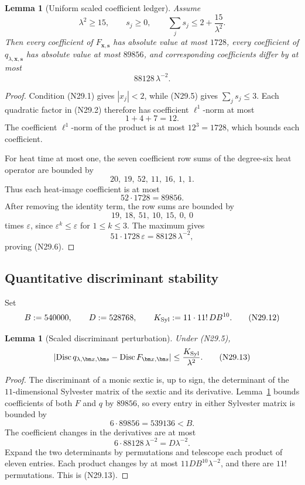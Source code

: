 \documentclass[11pt]{article}
\newtheorem{lemma}[theorem]{Lemma}
\theoremstyle{definition}
\theoremstyle{remark}
\begin{document}
\begin{lemma}[Uniform scaled coefficient ledger]
\label{lem:f2v29-scaled-ledger}
Assume
\[
 \lambda^2\geq15,\qquad
 s_j\geq0,\qquad
 \sum_js_j\leq2+\frac{15}{\lambda^2}.
 \tag{N29.5}
\]
Then every coefficient of \(F_{\bm x,\bm s}\) has absolute value at
most \(1728\), every coefficient of
\(q_{\lambda,\bm x,\bm s}\) has absolute value at most \(89856\), and
corresponding coefficients differ by at most
\[
 88128\,\lambda^{-2}.
 \tag{N29.6}
\]
\end{lemma}

\begin{proof}
Condition \textup{(N29.1)} gives \(|x_j|<2\), while
\textup{(N29.5)} gives \(\sum_js_j\leq3\).  Each quadratic factor in
\textup{(N29.2)} therefore has coefficient \(\ell^1\)-norm at most
\[
 1+4+7=12.
 \tag{N29.7}
\]
The coefficient \(\ell^1\)-norm of the product is at most
\(12^3=1728\), which bounds each coefficient.

For heat time at most one, the seven coefficient row sums of the
degree-six heat operator are bounded by
\[
 20,\ 19,\ 52,\ 11,\ 16,\ 1,\ 1.
 \tag{N29.8}
\]
Thus each heat-image coefficient is at most
\[
 52\cdot1728=89856.
 \tag{N29.9}
\]
After removing the identity term, the row sums are bounded by
\[
 19,\ 18,\ 51,\ 10,\ 15,\ 0,\ 0
 \tag{N29.10}
\]
times \(\varepsilon\), since
\(\varepsilon^k\leq\varepsilon\) for \(1\leq k\leq3\).
The maximum gives
\[
 51\cdot1728\,\varepsilon
 =88128\,\lambda^{-2},
 \tag{N29.11}
\]
proving \textup{(N29.6)}.
\end{proof}

\subsection{Quantitative discriminant stability}
\label{subsec:f2v29-discriminant}

Set
\[
 B:=540000,\qquad D:=528768,\qquad
 K_{\rm Syl}:=11\cdot11!\,D B^{10}.
 \tag{N29.12}
\]

\begin{lemma}[Scaled discriminant perturbation]
\label{lem:f2v29-disc-perturb}
Under \textup{(N29.5)},
\[
 \left|
 \operatorname{Disc}q_{\lambda,\bm x,\bm s}
 -\operatorname{Disc}F_{\bm x,\bm s}
 \right|
 \leq\frac{K_{\rm Syl}}{\lambda^2}.
 \tag{N29.13}
\]
\end{lemma}

\begin{proof}
The discriminant of a monic sextic is, up to sign, the determinant of
the \(11\)-dimensional Sylvester matrix of the sextic and its derivative.
Lemma~\ref{lem:f2v29-scaled-ledger} bounds coefficients of both
\(F\) and \(q\) by \(89856\), so every entry in either Sylvester matrix
is bounded by
\[
 6\cdot89856=539136<B.
 \tag{N29.14}
\]
The coefficient changes in the derivatives are at most
\[
 6\cdot88128\,\lambda^{-2}
 =D\lambda^{-2}.
 \tag{N29.15}
\]
Expand the two determinants by permutations and telescope each product
of eleven entries.  Each product changes by at most
\(11DB^{10}\lambda^{-2}\), and there are \(11!\) permutations.  This is
\textup{(N29.13)}.
\end{proof}
\end{document}
